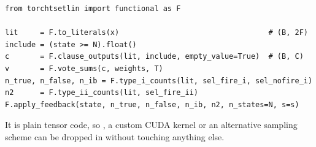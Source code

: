 \begin{lstlisting}[style=ttpython]
from torchtsetlin import functional as F

lit     = F.to_literals(x)                                  # (B, 2F)
include = (state >= N).float()
c       = F.clause_outputs(lit, include, empty_value=True)  # (B, C)
v       = F.vote_sums(c, weights, T)
n_true, n_false, n_ib = F.type_i_counts(lit, sel_fire_i, sel_nofire_i)
n2      = F.type_ii_counts(lit, sel_fire_ii)
F.apply_feedback(state, n_true, n_false, n_ib, n2, n_states=N, s=s)
\end{lstlisting}

It is plain tensor code, so , a custom CUDA kernel or an alternative
sampling scheme can be dropped in without touching anything else.
